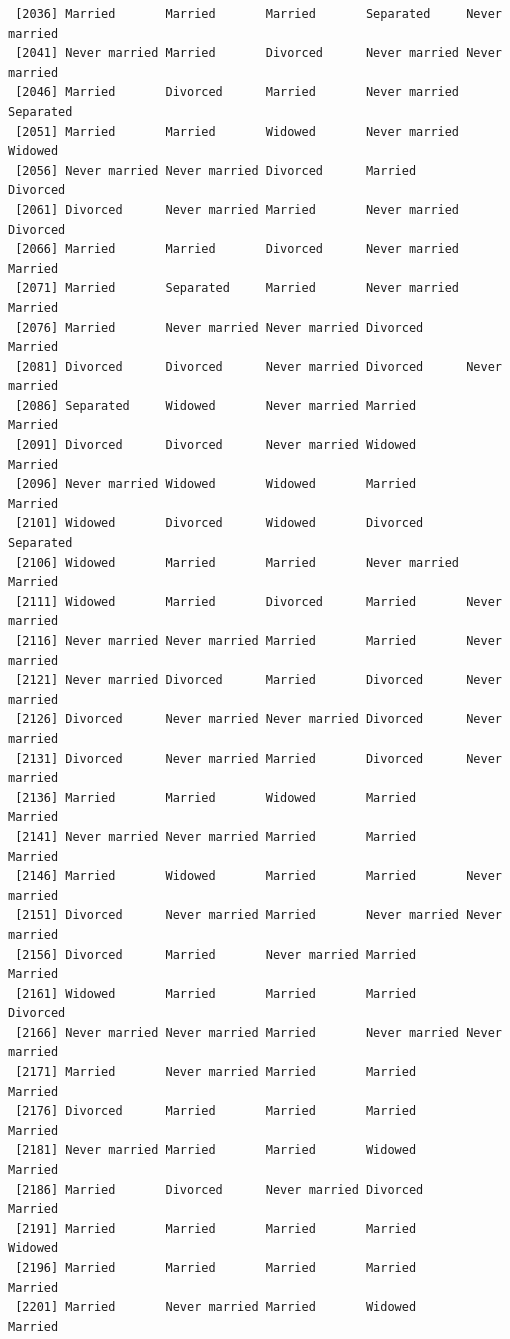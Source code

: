 \documentclass[
  letterpaper,
  DIV=11,
  numbers=noendperiod,
  oneside]{scrartcl}
\begin{document}
\begin{verbatim}
 [2036] Married       Married       Married       Separated     Never married
 [2041] Never married Married       Divorced      Never married Never married
 [2046] Married       Divorced      Married       Never married Separated    
 [2051] Married       Married       Widowed       Never married Widowed      
 [2056] Never married Never married Divorced      Married       Divorced     
 [2061] Divorced      Never married Married       Never married Divorced     
 [2066] Married       Married       Divorced      Never married Married      
 [2071] Married       Separated     Married       Never married Married      
 [2076] Married       Never married Never married Divorced      Married      
 [2081] Divorced      Divorced      Never married Divorced      Never married
 [2086] Separated     Widowed       Never married Married       Married      
 [2091] Divorced      Divorced      Never married Widowed       Married      
 [2096] Never married Widowed       Widowed       Married       Married      
 [2101] Widowed       Divorced      Widowed       Divorced      Separated    
 [2106] Widowed       Married       Married       Never married Married      
 [2111] Widowed       Married       Divorced      Married       Never married
 [2116] Never married Never married Married       Married       Never married
 [2121] Never married Divorced      Married       Divorced      Never married
 [2126] Divorced      Never married Never married Divorced      Never married
 [2131] Divorced      Never married Married       Divorced      Never married
 [2136] Married       Married       Widowed       Married       Married      
 [2141] Never married Never married Married       Married       Married      
 [2146] Married       Widowed       Married       Married       Never married
 [2151] Divorced      Never married Married       Never married Never married
 [2156] Divorced      Married       Never married Married       Married      
 [2161] Widowed       Married       Married       Married       Divorced     
 [2166] Never married Never married Married       Never married Never married
 [2171] Married       Never married Married       Married       Married      
 [2176] Divorced      Married       Married       Married       Married      
 [2181] Never married Married       Married       Widowed       Married      
 [2186] Married       Divorced      Never married Divorced      Married      
 [2191] Married       Married       Married       Married       Widowed      
 [2196] Married       Married       Married       Married       Married      
 [2201] Married       Never married Married       Widowed       Married      

\end{verbatim}
\end{document}
